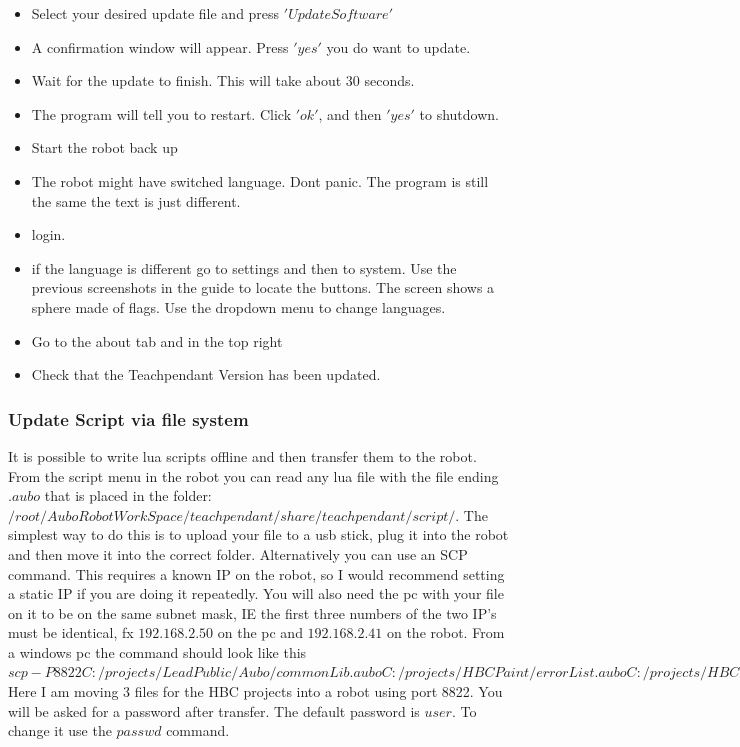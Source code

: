 \documentclass{article}
\begin{document}
\begin{itemize}
\item Select your desired update file and press $'Update Software'$
\item A confirmation window will appear. Press $'yes'$ you do want to update.
\item Wait for the update to finish. This will take about 30 seconds. 
\item The program will tell you to restart. Click $'ok'$, and then $'yes'$ to shutdown.
\item Start the robot back up
\item The robot might have switched language. Dont panic. The program is still the same the text is just different. 
\item login. 
\item if the language is different go to settings and then to system. Use the previous screenshots in the guide to locate the buttons. The screen shows a sphere made of flags. Use the dropdown menu to change languages.
\item Go to the about tab and in the top right
\item Check that the Teachpendant Version has been updated. 
\end{itemize}

\subsubsection{Update Script via file system}

It is possible to write lua scripts offline and then transfer them to the robot. From the script menu in the robot you can read any lua file with the file ending $.aubo$ that is placed in the folder: $/root/AuboRobotWorkSpace/teachpendant/share/teachpendant/script/$. The simplest way to do this is to upload your file to a usb stick, plug it into the robot and then move it into the correct folder. 
Alternatively you can use an SCP command. This requires a known IP on the robot, so I would recommend setting a static IP if you are doing it repeatedly. You will also need the pc with your file on it to be on the same subnet mask, IE the first three numbers of the two IP's must be identical, fx $192.168.2.50$ on the pc and $192.168.2.41$ on the robot.  
From a windows pc the command should look like this
$scp -P 8822 C:/projects/LeadPublic/Aubo/commonLib.aubo C:/projects/HBCPaint/errorList.aubo C:/projects/HBCPaint/HBCPaint.aubo C:/projects/HBCPaint/HBCPaintNodes.aubo root@192.168.2.41:/root/AuboRobotWorkSpace/teachpendant/share/teachpendant/script/$
Here I am moving 3 files for the HBC projects into a robot using port 8822. 
You will be asked for a password after transfer. The default password is $user$. To change it use the $passwd$ command.
\end{document}
